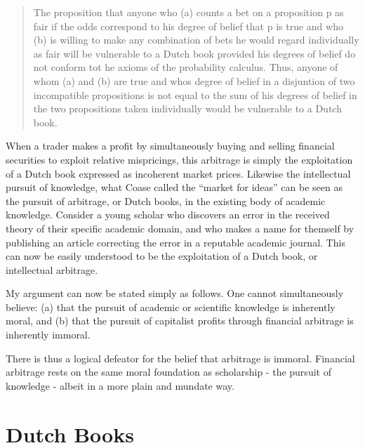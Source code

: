 \documentclass[11pt,]{article}
\begin{document}
\begin{quote}
The proposition that anyone who (a) counts a bet on a proposition p as
fair if the odds correspond to his degree of belief that p is true and
who (b) is willing to make any combination of bets he would regard
individually as fair will be vulnerable to a Dutch book provided his
degrees of belief do not conform tot he axioms of the probability
calculus. Thus, anyone of whom (a) and (b) are true and whos degree of
belief in a disjuntion of two incompatible propositions is not equal to
the sum of his degrees of belief in the two propositions taken
individually would be vulnerable to a Dutch book.
\end{quote}

When a trader makes a profit by simultaneously buying and selling
financial securities to exploit relative mispricings, this arbitrage is
simply the exploitation of a Dutch book expressed as incoherent market
prices. Likewise the intellectual pursuit of knowledge, what Coase
called the ``market for ideas'' can be seen as the pursuit of arbitrage,
or Dutch books, in the existing body of academic knowledge. Consider a
young scholar who discovers an error in the received theory of their
specific academic domain, and who makes a name for themself by
publishing an article correcting the error in a reputable academic
journal. This can now be easily understood to be the exploitation of a
Dutch book, or intellectual arbitrage.

My argument can now be stated simply as follows. One cannot
simultaneously believe: (a) that the pursuit of academic or scientific
knowledge is inherently moral, and (b) that the pursuit of capitalist
profits through financial arbitrage is inherently immoral.

There is thus a logical defeator for the belief that arbitrage is
immoral. Financial arbitrage rests on the same moral foundation as
scholarship - the pursuit of knowledge - albeit in a more plain and
mundate way.

\section{Dutch Books}\label{dutch-books}

\section{}\label{section}

\newpage
\singlespacing 

\end{document}

